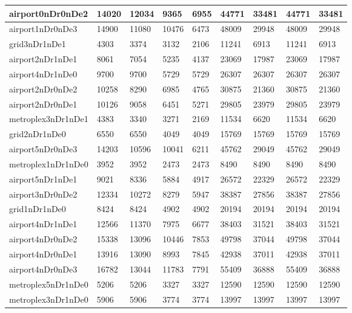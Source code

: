 \documentclass[../thesis.tex]{subfiles}
\begin{document}
\begin{table}[!ht]
\begin{tabular}{|l|l|l|l|l|l|l|l|l|}
        airport0nDr0nDe2 & 14020 & 12034 & 9365 & 6955 & 44771 & 33481 & 44771 & 33481 \\ \hline
        airport1nDr0nDe3 & 14900 & 11080 & 10476 & 6473 & 48009 & 29948 & 48009 & 29948 \\ \hline
        grid3nDr1nDe1 & 4303 & 3374 & 3132 & 2106 & 11241 & 6913 & 11241 & 6913 \\ \hline
        airport2nDr1nDe1 & 8061 & 7054 & 5235 & 4137 & 23069 & 17987 & 23069 & 17987 \\ \hline
        airport4nDr1nDe0 & 9700 & 9700 & 5729 & 5729 & 26307 & 26307 & 26307 & 26307 \\ \hline
        airport2nDr0nDe2 & 10258 & 8290 & 6985 & 4765 & 30875 & 21360 & 30875 & 21360 \\ \hline
        airport2nDr0nDe1 & 10126 & 9058 & 6451 & 5271 & 29805 & 23979 & 29805 & 23979 \\ \hline
        metroplex3nDr1nDe1 & 4383 & 3340 & 3271 & 2169 & 11534 & 6620 & 11534 & 6620 \\ \hline
        grid2nDr1nDe0 & 6550 & 6550 & 4049 & 4049 & 15769 & 15769 & 15769 & 15769 \\ \hline
        airport5nDr0nDe3 & 14203 & 10596 & 10041 & 6211 & 45762 & 29049 & 45762 & 29049 \\ \hline
        metroplex1nDr1nDe0 & 3952 & 3952 & 2473 & 2473 & 8490 & 8490 & 8490 & 8490 \\ \hline
        airport5nDr1nDe1 & 9021 & 8336 & 5884 & 4917 & 26572 & 22329 & 26572 & 22329 \\ \hline
        airport3nDr0nDe2 & 12334 & 10272 & 8279 & 5947 & 38387 & 27856 & 38387 & 27856 \\ \hline
        grid1nDr1nDe0 & 8424 & 8424 & 4902 & 4902 & 20194 & 20194 & 20194 & 20194 \\ \hline
        airport4nDr1nDe1 & 12566 & 11370 & 7975 & 6677 & 38403 & 31521 & 38403 & 31521 \\ \hline
        airport4nDr0nDe2 & 15338 & 13096 & 10446 & 7853 & 49798 & 37044 & 49798 & 37044 \\ \hline
        airport4nDr0nDe1 & 13916 & 13090 & 8993 & 7845 & 42938 & 37011 & 42938 & 37011 \\ \hline
        airport4nDr0nDe3 & 16782 & 13044 & 11783 & 7791 & 55409 & 36888 & 55409 & 36888 \\ \hline
        metroplex5nDr1nDe0 & 5206 & 5206 & 3327 & 3327 & 12590 & 12590 & 12590 & 12590 \\ \hline
        metroplex3nDr1nDe0 & 5906 & 5906 & 3774 & 3774 & 13997 & 13997 & 13997 & 13997 \\ \hline

\end{tabular}
\end{table}
\end{document}
